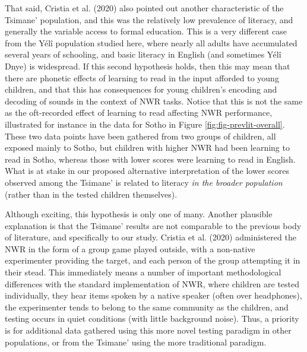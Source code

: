 \documentclass[english,,man,floatsintext]{apa6}
\begin{document}
That said, Cristia et al. (2020) also pointed out another characteristic of the Tsimane' population, and this was the relatively low prevalence of literacy, and generally the variable access to formal education. This is a very different case from the Yélî population studied here, where nearly all adults have accumulated several years of schooling, and basic literacy in English (and sometimes Yélî Dnye) is widespread. If this second hypothesis holds, then this may mean that there are phonetic effects of learning to read in the input afforded to young children, and that this has consequences for young children's encoding and decoding of sounds in the context of NWR tasks. Notice that this is not the same as the oft-recorded effect of learning to read affecting NWR performance, illustrated for instance in the data for Sotho in Figure \ref{fig:fig-prevlit-overall}. These two data points have been gathered from two groups of children, all exposed mainly to Sotho, but children with higher NWR had been learning to read in Sotho, whereas those with lower scores were learning to read in English. What is at stake in our proposed alternative interpretation of the lower scores observed among the Tsimane' is related to literacy \emph{in the broader population} (rather than in the tested children themselves).

Although exciting, this hypothesis is only one of many. Another plausible explanation is that the Tsimane' results are not comparable to the previous body of literature, and specifically to our study. Cristia et al. (2020) administered the NWR in the form of a group game played outside, with a non-native experimenter providing the target, and each person of the group attempting it in their stead. This immediately means a number of important methodological differences with the standard implementation of NWR, where children are tested individually, they hear items spoken by a native speaker (often over headphones), the experimenter tends to belong to the same community as the children, and testing occurs in quiet conditions (with little background noise). Thus, a priority is for additional data gathered using this more novel testing paradigm in other populations, or from the Tsimane' using the more traditional paradigm.
\end{document}
